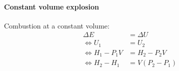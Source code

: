 \documentclass[10pt, twocolumn]{article}
\begin{document}
\paragraph{Constant volume explosion}
Combustion at a constant volume:
\[
  \begin{split}
    \Delta E & = \Delta U \\
    \iff U_1 & = U_2 \\
    \iff H_1 - P_1 V & = H_2 - P_2V \\
    \iff H_2 - H_1 & = V(P_2 - P_1) \\
  \end{split}
\]
\end{document}
